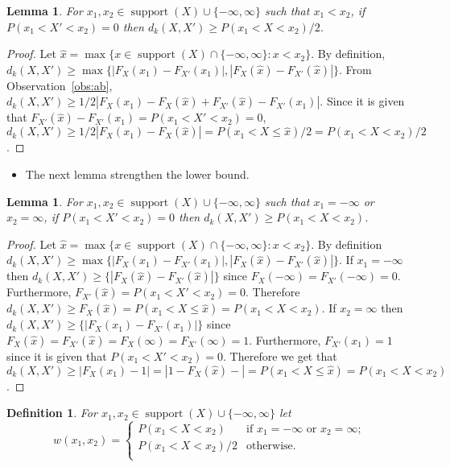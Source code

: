 \documentclass{article}
\newtheorem{lemma}[thm]{Lemma}
\newtheorem{definition}[thm]{Definition}
\DeclareMathOperator{\support}{support}
\begin{document}
\begin{lemma}\label{lem:geq}
	For $x_1, x_2 \in \support(X) \cup \{-\infty,\infty\}$ such that $x_1 < x_2$, if $P(x_1 < X' < x_2)=0$  then 
	$d_k(X,X') \geq P(x_1 < X < x_2)/2$.
\end{lemma}
\begin{proof}
	Let $\hat x=\max \{x \in \support(X) \cap\{ -\infty, \infty\}  \colon x < x_2 \}$. By definition, $d_k(X,X') \geq \max \{|F_X(x_1) - F_{X'}(x_1)|, |F_X(\hat x) - F_{X'}(\hat x)| \}$. From Observation~\ref{obs:ab}, $d_k(X,X') \geq 1/2|F_X(x_1) - F_X(\hat x) + F_{X'}(\hat x) - F_{X'}(x_1)|$. Since it is given that $F_{X'}(\hat x) - F_{X'}(x_1) = P(x_1 < X' < x_2)=0$, $d_k(X,X') \geq 1/2|F_X(x_1) - F_X(\hat x) | =  P(x_1 < X \leq \hat x)/2 = P(x_1 < X < x_2)/2$.
\end{proof}


\begin{itemize}
	\item The next lemma strengthen the lower bound.
\end{itemize}


\begin{lemma}\label{lem:geq2}
	For $x_1, x_2 \in \support(X) \cup \{-\infty,\infty\}$ such that $x_1=-\infty$ or  $x_2=\infty$, if $P(x_1 < X' < x_2)=0$  then 
	$d_k(X,X') \geq P(x_1 < X < x_2)$.
\end{lemma}
\begin{proof}
	Let $\hat x=\max \{x \in \support(X) \cap\{ -\infty, \infty\}  \colon x < x_2 \}$. By definition $d_k(X,X') \geq \max \{|F_X(x_1) - F_{X'}(x_1)|, |F_X(\hat x) - F_{X'}(\hat x)| \}$. If $x_1=-\infty$ then $d_k(X,X') \geq \{|F_X(\hat x) - F_{X'}(\hat x)| \}$ since $F_X(-\infty) = F_{X'}(-\infty) = 0$. Furthermore, $F_{X'}(\hat x) = P(x_1 < X' < x_2)=0$. Therefore $d_k(X,X') \geq F_X(\hat x) = P(x_1 < X \leq \hat x) = P(x_1 < X < x_2)$. 
	If $x_2=\infty$ then $d_k(X,X') \geq \{|F_X(x_1) - F_{X'}(x_1)| \}$ since $F_X(\hat{x}) = F_{X'}(\hat{x}) = F_X(\infty) = F_{X'}(\infty) = 1$. Furthermore, $F_{X'}(x_1) = 1$ since it is given that $P(x_1 < X' < x_2)=0$. Therefore we get that $d_k(X,X') \geq |F_X(x_1)-1| = |1-F_X(\hat x)-| = P(x_1 < X \leq \hat x) = P(x_1 < X < x_2)$.
\end{proof}


\begin{definition}\label{def:weight} For $x_1,x_2 \in \support(X) \cup \{-\infty,\infty\}$ let
	\[
	w(x_1,x_2)=
	\begin{cases}
		P(x_1 < X < x_2) & \text{if $x_1=-\infty$ or $x_2 = \infty$;} \\
		P(x_1 < X < x_2)/2 & \text{otherwise.} \\	
	\end{cases}
	\]
\end{definition} 
\end{document}
